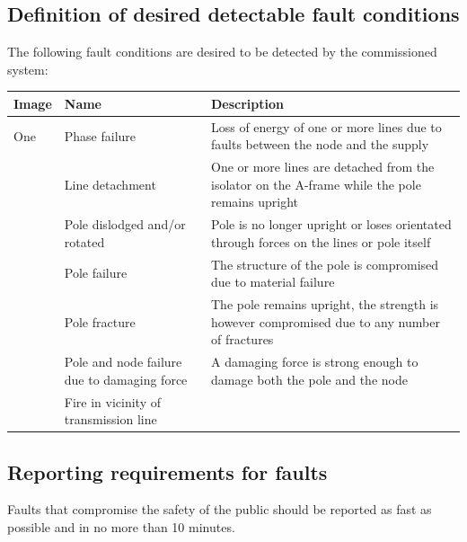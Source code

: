 \documentclass[12pt]{article}
\begin{document}
\subsection{Definition of desired detectable fault conditions}
The following fault conditions are desired to be detected by the commissioned system:

\begin{center}
\begin{table}[htp]
  
  \hskip-2.2cm\begin{tabular}{|p{4cm}|p{4cm}|p{10cm}|}
      \hline
      \textbf{Image} & \textbf{Name} & \textbf{Description} \\
      \hline
      One & Phase failure & Loss of energy of one or more lines due to faults between the node and the supply \\
       & Line detachment & One or more lines are detached from the isolator on the A-frame while the pole remains
       upright \\
       & Pole dislodged and/or rotated & Pole is no longer upright or loses orientated through forces on the lines or pole itself \\
       & Pole failure & The structure of the pole is compromised due to material failure \\
       & Pole fracture & The pole remains upright, the strength is however compromised due to any number of fractures \\
       & Pole and node failure due to damaging force & A damaging force is strong enough to damage both the pole and the
       node\\
       & Fire in vicinity of transmission line & \\
      \hline

  \end{tabular}    

\label{tab:summary_measurments}
\end{table}
\end{center}


\subsection{Reporting requirements for faults}
Faults that compromise the safety of the public should be reported as fast as possible and in no more than 10 minutes.
\end{document}

